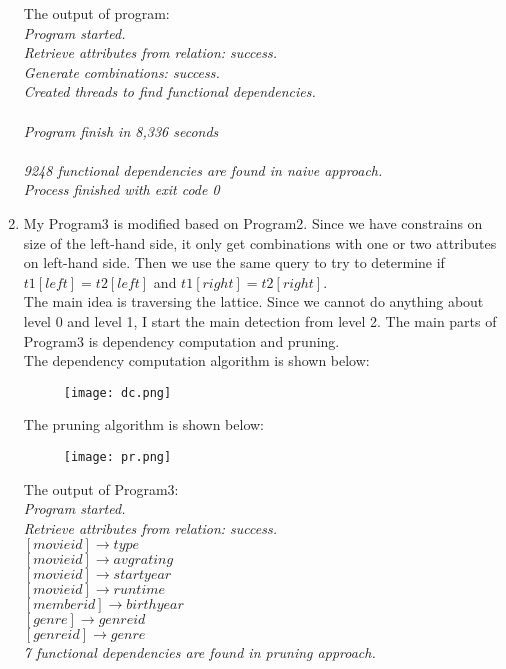 \documentclass[a4paper]{article}
\begin{document}
\begin{enumerate}
The output of program:\\
\textsl{
Program started.\\
Retrieve attributes from relation: success.\\
Generate combinations: success.\\
Created threads to find functional dependencies.\\
\\
Program finish in 8,336 seconds\\
\\
9248 functional dependencies are found in naive approach.
\\
Process finished with exit code 0
}







\item
My Program3 is modified based on Program2. Since we have constrains on size of the left-hand side, it only get combinations with one or two attributes on left-hand side. Then we use the same query to try to determine if $t1[left] = t2[left]$ and $t1[right] = t2[right]$. \\
The main idea is traversing the lattice. Since we cannot do anything about level 0 and level 1, I start the main detection from level 2. The main parts of Program3 is dependency computation and pruning.\\
The dependency computation algorithm is shown below:
\begin{figure}[H]
\centering
\texttt{[image: dc.png]}
\end{figure}
The pruning algorithm is shown below:
\begin{figure}[H]
\centering
\texttt{[image: pr.png]}
\end{figure}
The output of Program3:\\
\textsl{
Program started.\\
Retrieve attributes from relation: success.\\
$[movieid]\rightarrow type$\\
$[movieid]\rightarrow avgrating$\\
$[movieid]\rightarrow startyear$\\
$[movieid]\rightarrow runtime$\\
$[memberid]\rightarrow birthyear$\\
$[genre]\rightarrow genreid$\\
$[genreid]\rightarrow genre$\\
7 functional dependencies are found in pruning approach.\\
}
\end{enumerate}
\end{document}
